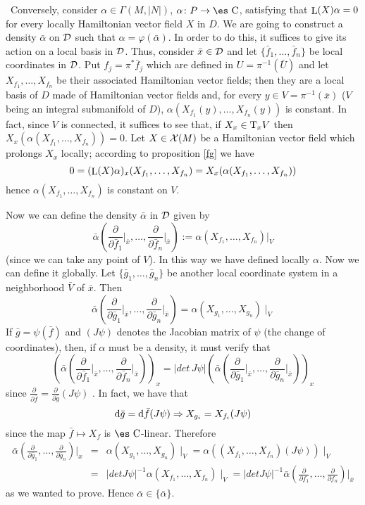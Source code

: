 \documentclass[12pt]{article}
\theoremstyle{plain}
\def\beann{\begin{eqnarray*}}
\def\eeann{\end{eqnarray*}}
\def\dst{\(}
\def\derpar#1#2{\frac{\partial{#1}}{\partial{#2}}}
\def\qed{\ifvmode\removelastskip\fi
{\unskip\nobreak\hfil\penalty50\hbox{}\nobreak\hfil
\hbox{\vrule height1.2ex width1.2ex}\parfillskip=0pt
\finalhyphendemerits=0 \par\smallskip}}
\def\d{{\rm d}}
\def\Complex{\mbox{\es C}}
\def\Tan{{\rm T}}
\def\Lie{\mathop{\rm L}\nolimits}
\begin{document}
\qquad \qquad \
Conversely, consider $\alpha \in \Gamma(M,| N |)$, $\alpha \colon P \to
\Complex$,
satisfying that $\Lie(X)\alpha = 0$
for every locally Hamiltonian vector field $X$ in $D$.
We are going to construct a density $\bar \alpha$  on ${\cal D}$ such
that
$\alpha = \varphi (\bar \alpha)$. In order to do this,
it suffices to give its action on a local basis in ${\cal D}$.
Thus, consider $\bar x \in {\cal D}$ and let $\{ \bar f_1,\ldots , \bar
f_n \}$
be local coordinates in ${\cal D}$. Put $f_j = \pi^*\bar f_j$
which are defined in $U = \pi^{-1}(\bar U)$ and let
$X_{f_1}, \ldots ,X_{f_n}$ be their associated Hamiltonian vector
fields;
then they are a local basis of $D$ made of Hamiltonian vector fields
and,
for every $y \in V = \pi^{-1} (\bar x)$ ($V$ being an integral
submanifold of $D$),
$\alpha (X_{f_1}(y), \ldots ,X_{f_n}(y))$ is constant. In fact,
since $V$ is connected, it suffices to see that, if $X_x \in \Tan_xV$
then $X_x(\alpha (X_{f_1}, \ldots ,X_{f_n}))=0$.
Let $X \in {\cal X}(M)$ be a Hamiltonian vector field
which prolongs $X_x$ locally; according to proposition \ref{fg}
we have
$$
0 = (\Lie(X)\alpha)_x(X_{f_1}, \ldots ,X_{f_n}) =
X_x(\alpha(X_{f_1}, \ldots ,X_{f_n}))
$$
hence $\alpha (X_{f_1}, \ldots ,X_{f_n})$ is constant on $V$.

Now we  can define the density $\bar \alpha$ in ${\cal D}$ given
by $$ \bar \alpha \left(\derpar{}{\bar f_1}\Big\vert_{\bar
x},\ldots , \derpar{}{\bar f_n}\Big\vert_{\bar x}\right) := \alpha
(X_{f_1}, \ldots ,X_{f_n}) \Big\vert_V $$ (since we can take any
point of $V$). In this way we have defined locally $\alpha$. Now
we can define it globally. Let $\{\bar g_1, \ldots ,\bar g_n \}$
be another local coordinate system in a neighborhood $\bar V$ of
$\bar x$. Then $$ \bar \alpha\left(\derpar{}{\bar
g_1}\Big\vert_{\bar x},\ldots , \derpar{}{\bar g_n}\Big\vert_{\bar
x}\right) = \alpha (X_{g_1}, \ldots ,X_{g_n}) \mid_V $$ If $\bar g
= \psi (\bar f)$ and $(J\psi )$ denotes the Jacobian matrix of
$\psi$ (the change of coordinates), then, if $\alpha$ must be a
density, it must verify that $$ \left(\bar
\alpha\left(\derpar{}{\bar f_1}\Big\vert_{\bar x},\ldots ,
\derpar{}{\bar f_n}\Big\vert_{\bar x}\right)\right)_x = |det\,
J\psi| \left(\bar \alpha\left(\derpar{}{\bar g_1}\Big\vert_{\bar
x},\ldots , \derpar{}{\bar g_n}\Big\vert_{\bar x}\right)\right)_x
$$ since \dst\derpar{}{\bar f} = \derpar{}{\bar g} (J\psi )\) . In
fact, we have that $$ \d \bar g = \d \bar f (J\psi ) \Rightarrow
X_{g_i} = X_{f_i} (J\psi) $$ since the map $\bar f\mapsto X_f$ is
$\Complex$-linear. Therefore \beann \bar
\alpha\left(\derpar{}{\bar g_1},\ldots ,\derpar{}{\bar
g_n}\right)\Big\vert_x &=& \alpha (X_{g_1}, \ldots ,X_{g_n})
\mid_V= \alpha ((X_{f_1}, \ldots ,X_{f_n})(J\psi )) \mid_V
\\ &=&
|detJ\psi |^{-1}\alpha (X_{f_1}, \ldots ,X_{f_n}) \mid_V=
|detJ\psi |^{-1} \bar \alpha\left(\derpar{}{f_1}, \ldots
,\derpar{}{f_n}\right)\Big\vert_{\bar x}
\eeann
as we wanted to prove. Hence $\bar \alpha \in \{\bar \alpha \}$.
\qed
\end{document}
